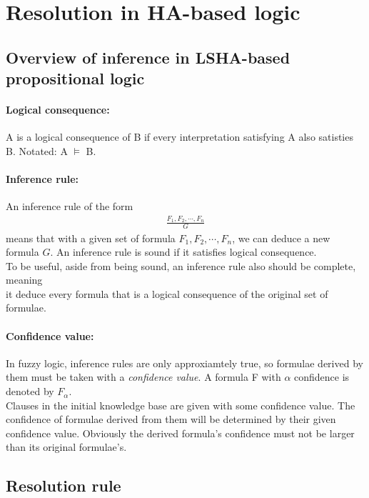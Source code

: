 \documentclass[part1.tex]{subfiles}
\begin{document}
\section{Resolution in HA-based logic}
\subsection{Overview of inference in LSHA-based propositional logic}
\paragraph{Logical consequence:} A is a logical consequence of B if every interpretation 
satisfying A also satisties B. Notated: A \(\models\) B.\\
\paragraph{Inference rule:} An inference rule of the form\\
\begin{align*}
	\frac{F_1, F_2,\cdots,F_n}{G}
\end{align*}
means that with a given set of formula \(F_1,F_2,\cdots,F_n\), we can deduce a 
new formula \(G\). An inference rule is sound if it satisfies logical consequence.\\
To be useful, aside from being sound, an inference rule also should be complete, meaning\\
it deduce every formula that is a logical consequence of the original set of formulae.\\
\paragraph{Confidence value:}
In fuzzy logic, inference rules are only approxiamtely true, so formulae derived by them must be
taken with a {\em confidence value}. A formula F with \(\alpha\) confidence is denoted by \(F_\alpha\).\\

Clauses in the initial knowledge base are given with some confidence value. The confidence of formulae
derived from them will be determined by their given confidence value. Obviously the derived formula's 
confidence must not be larger than its original formulae's.

\subsection{Resolution rule}
\end{document}
